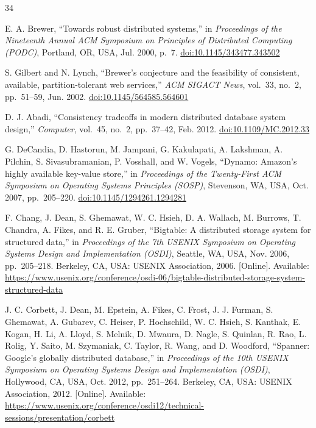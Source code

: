 \documentclass[conference]{IEEEtran}
\begin{document}
\begin{thebibliography}{34}

E. A. Brewer, ``Towards robust distributed systems,'' in \textit{Proceedings of the Nineteenth Annual ACM Symposium on Principles of Distributed Computing (PODC)}, Portland, OR, USA, Jul. 2000, p.~7.
\href{https://doi.org/10.1145/343477.343502}{doi:10.1145/343477.343502}

S. Gilbert and N. Lynch, ``Brewer's conjecture and the feasibility of consistent, available, partition-tolerant web services,'' \textit{ACM SIGACT News}, vol.~33, no.~2, pp.~51--59, Jun. 2002.
\href{https://doi.org/10.1145/564585.564601}{doi:10.1145/564585.564601}

D. J. Abadi, ``Consistency tradeoffs in modern distributed database system design,'' \textit{Computer}, vol.~45, no.~2, pp.~37--42, Feb. 2012.
\href{https://doi.org/10.1109/MC.2012.33}{doi:10.1109/MC.2012.33}

G. DeCandia, D. Hastorun, M. Jampani, G. Kakulapati, A. Lakshman, A. Pilchin, S. Sivasubramanian, P. Vosshall, and W. Vogels, ``Dynamo: Amazon's highly available key-value store,'' in \textit{Proceedings of the Twenty-First ACM Symposium on Operating Systems Principles (SOSP)}, Stevenson, WA, USA, Oct. 2007, pp.~205--220.
\href{https://doi.org/10.1145/1294261.1294281}{doi:10.1145/1294261.1294281}

F. Chang, J. Dean, S. Ghemawat, W. C. Hsieh, D. A. Wallach, M. Burrows, T. Chandra, A. Fikes, and R. E. Gruber, ``Bigtable: A distributed storage system for structured data,'' in \textit{Proceedings of the 7th USENIX Symposium on Operating Systems Design and Implementation (OSDI)}, Seattle, WA, USA, Nov. 2006, pp.~205--218. Berkeley, CA, USA: USENIX Association, 2006. [Online]. Available:
\url{https://www.usenix.org/conference/osdi-06/bigtable-distributed-storage-system-structured-data}

J. C. Corbett, J. Dean, M. Epstein, A. Fikes, C. Frost, J. J. Furman, S. Ghemawat, A. Gubarev, C. Heiser, P. Hochschild, W. C. Hsieh, S. Kanthak, E. Kogan, H. Li, A. Lloyd, S. Melnik, D. Mwaura, D. Nagle, S. Quinlan, R. Rao, L. Rolig, Y. Saito, M. Szymaniak, C. Taylor, R. Wang, and D. Woodford, ``Spanner: Google's globally distributed database,'' in \textit{Proceedings of the 10th USENIX Symposium on Operating Systems Design and Implementation (OSDI)}, Hollywood, CA, USA, Oct. 2012, pp.~251--264. Berkeley, CA, USA: USENIX Association, 2012. [Online]. Available:
\url{https://www.usenix.org/conference/osdi12/technical-sessions/presentation/corbett}


\end{thebibliography}
\end{document}
